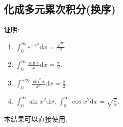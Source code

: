 \documentclass[../../main.tex]{subfiles}
\begin{document}
\subsection{化成多元累次积分(换序)}

\begin{proposition}\label{proposition:重要定积分结果(必记)}
证明:
\begin{enumerate}[(1)]
\item \(\int_{0}^{\infty} e^{-x^{2}}\mathrm{d}x=\frac{\sqrt{\pi}}{2}\).

\item \(\int_{0}^{\infty} \frac{\sin x}{x}\mathrm{d}x=\frac{\pi}{2}\).

\item $\int_0^{+\infty}{\frac{\sin ^2x}{x^2}\mathrm{d}x}=\frac{\pi}{2}.$

\item\(\int_{0}^{\infty} \sin x^{2}\mathrm{d}x\), \(\int_{0}^{\infty} \cos x^{2}\mathrm{d}x=\sqrt{\frac{\pi}{8}}\). 
\end{enumerate}
\end{proposition}
\begin{note}
本结果可以直接使用.
\end{note}
\end{document}
